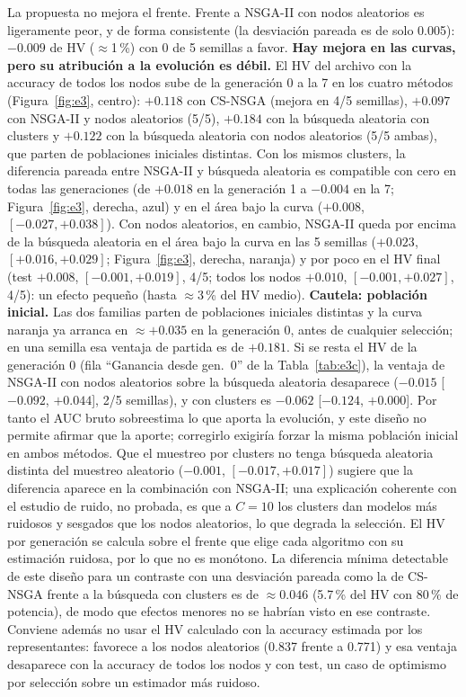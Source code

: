 \documentclass[11pt,a4paper]{article}
\begin{document}
La propuesta no mejora el frente. Frente a NSGA-II con nodos aleatorios es ligeramente peor, y de forma consistente (la desviación pareada es de solo 0.005): $-0.009$ de HV ($\approx$1\,\%) con 0 de 5 semillas a favor. \textbf{Hay mejora en las curvas, pero su atribución a la evolución es débil.} El HV del archivo con la accuracy de todos los nodos sube de la generación 0 a la 7 en los cuatro métodos (Figura~\ref{fig:e3}, centro): $+0.118$ con CS-NSGA (mejora en 4/5 semillas), $+0.097$ con NSGA-II y nodos aleatorios (5/5), $+0.184$ con la búsqueda aleatoria con clusters y $+0.122$ con la búsqueda aleatoria con nodos aleatorios (5/5 ambas), que parten de poblaciones iniciales distintas. Con los mismos clusters, la diferencia pareada entre NSGA-II y búsqueda aleatoria es compatible con cero en todas las generaciones (de $+0.018$ en la generación 1 a $-0.004$ en la 7; Figura~\ref{fig:e3}, derecha, azul) y en el área bajo la curva ($+0.008$, $[-0.027,+0.038]$). Con nodos aleatorios, en cambio, NSGA-II queda por encima de la búsqueda aleatoria en el área bajo la curva en las 5 semillas ($+0.023$, $[+0.016,+0.029]$; Figura~\ref{fig:e3}, derecha, naranja) y por poco en el HV final (test $+0.008$, $[-0.001,+0.019]$, 4/5; todos los nodos $+0.010$, $[-0.001,+0.027]$, 4/5): un efecto pequeño (hasta $\approx$3\,\% del HV medio). \textbf{Cautela: población inicial.} Las dos familias parten de poblaciones iniciales distintas y la curva naranja ya arranca en $\approx+0.035$ en la generación 0, antes de cualquier selección; en una semilla esa ventaja de partida es de $+0.181$. Si se resta el HV de la generación 0 (fila ``Ganancia desde gen.~0'' de la Tabla~\ref{tab:e3c}), la ventaja de NSGA-II con nodos aleatorios sobre la búsqueda aleatoria desaparece ($-0.015$ [$-0.092$, $+0.044$], 2/5 semillas), y con clusters es $-0.062$ [$-0.124$, $+0.000$]. Por tanto el AUC bruto sobreestima lo que aporta la evolución, y este diseño no permite afirmar que la aporte; corregirlo exigiría forzar la misma población inicial en ambos métodos. Que el muestreo por clusters no tenga búsqueda aleatoria distinta del muestreo aleatorio ($-0.001$, $[-0.017,+0.017]$) sugiere que la diferencia aparece en la combinación con NSGA-II; una explicación coherente con el estudio de ruido, no probada, es que a $C=10$ los clusters dan modelos más ruidosos y sesgados que los nodos aleatorios, lo que degrada la selección. El HV por generación se calcula sobre el frente que elige cada algoritmo con su estimación ruidosa, por lo que no es monótono. La diferencia mínima detectable de este diseño para un contraste con una desviación pareada como la de CS-NSGA frente a la búsqueda con clusters es de $\approx0.046$ (5.7\,\% del HV con 80\,\% de potencia), de modo que efectos menores no se habrían visto en ese contraste. Conviene además no usar el HV calculado con la accuracy estimada por los representantes: favorece a los nodos aleatorios (0.837 frente a 0.771) y esa ventaja desaparece con la accuracy de todos los nodos y con test, un caso de optimismo por selección sobre un estimador más ruidoso.
\end{document}
